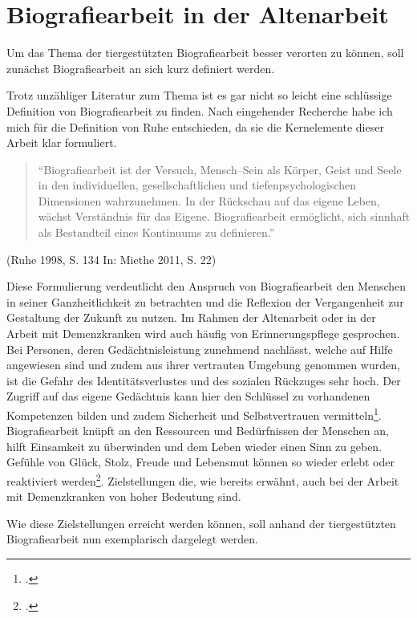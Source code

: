 \section{Biografiearbeit in der Altenarbeit}
\label{sec:k3_BiografiearbeitInDerAltenarbeit}

Um das Thema der tiergestützten Biografiearbeit besser verorten zu können, soll zunächst Biografiearbeit an sich kurz definiert werden. 

Trotz unzähliger Literatur zum Thema ist es gar nicht so leicht eine schlüssige Definition von Biografiearbeit zu finden. Nach eingehender Recherche habe ich mich für die Definition von Ruhe entschieden, da sie die Kernelemente dieser Arbeit klar formuliert.

\begin{quotation}
"`Biografiearbeit ist der Versuch, Mensch--Sein als Körper, Geist und Seele in den individuellen, gesellschaftlichen und tiefenpsychologischen Dimensionen wahrzunehmen. In der Rückschau auf das eigene Leben, wächst Verständnis für das Eigene. Biografiearbeit ermöglicht, sich sinnhaft als Bestandteil eines Kontinuums zu definieren."'
\end{quotation}

\begin{flushright}
(Ruhe 1998, S. 134 In: Miethe 2011, S. 22)
\end{flushright}

Diese Formulierung verdeutlicht den Anspruch von Biografiearbeit den Menschen in seiner Ganzheitlichkeit zu betrachten und die Reflexion der Vergangenheit zur Gestaltung der Zukunft zu nutzen.
Im Rahmen der Altenarbeit oder in der Arbeit mit Demenzkranken wird auch häufig von Erinnerungspflege gesprochen. Bei Personen, deren Gedächtnisleistung zunehmend nachlässt, welche auf Hilfe angewiesen sind und zudem aus ihrer vertrauten Umgebung genommen wurden, ist die Gefahr des Identitätsverlustes und des sozialen Rückzuges sehr hoch. Der Zugriff auf das eigene Gedächtnis kann hier den Schlüssel zu vorhandenen Kompetenzen bilden und zudem Sicherheit und Selbstvertrauen vermitteln\footcite[25]{Giruc2011}. Biografiearbeit knüpft an den Ressourcen und Bedürfnissen der Menschen an, hilft Einsamkeit zu überwinden und dem Leben wieder einen Sinn zu geben. Gefühle von Glück, Stolz, Freude und Lebensmut können so wieder erlebt oder reaktiviert werden\footcite[75]{Schwarz2009}. Zielstellungen die, wie bereits erwähnt, auch bei der Arbeit mit Demenzkranken von hoher Bedeutung sind. 

Wie diese Zielstellungen erreicht werden können, soll anhand der tiergestützten Biografiearbeit nun exemplarisch dargelegt werden.